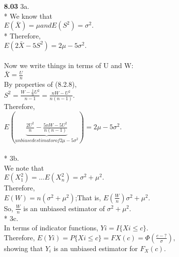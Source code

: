 {\bf 8.03}
3a.\\*
We know that\\
\indent$E(\bar{X})= \mu and E(S^{2})= \sigma ^{2} . $\\*
Therefore,\\
\indent$ E(2\bar{X}-5S^{2})= 2\mu - 5\sigma ^{2} .$\\
\\
Now we write things in terms of U and W:\\
\indent$ \bar{X}= \frac{U}{n}$\\


By properties of (8.2.8),\\
\indent$ S^{2}= \frac{W- \frac{1}{n} U^{2}}{n-1}= 
\frac{nW-U^{2}}{n(n-1)} .$\\

Therefore,\\
\indent$E(\underbrace{\frac{2U^{2}}{n}- 
\frac{5nW-5U^{2}}{n(n-1)}}_{unbiased estimator of 2\mu - 5\sigma ^{2} })= 
2\mu - 5\sigma ^{2}.$\\
\\*
3b.\\

We note that\\
\indent$E(X_{1}^{2})=\ldots E(X_{n}^{2})= \sigma ^{2}+ \mu ^{2}. 
$\\

Therefore,\\
\indent$ E(W)= n(\sigma ^{2}+ \mu ^{2})$;That is, 
$E(\frac{W}{n})\sigma ^{2}+ \mu ^{2} . $\\

So, \indent$\frac{W}{n}$ is an unbiased estimator of $\sigma ^{2}+ \mu ^{2}$.\\*
3c.\\

In terms of indicator functions, \indent$Yi = I\lbrace Xi \le c\rbrace . $\\

Therefore, \indent$E(Yi)=P\lbrace Xi \le c\rbrace = FX(c)= \Phi (\frac{c - 
?}{\sigma }),$\\

showing that $Y_{i}$ is an unbiased estimator for $F_{X}(c).$

